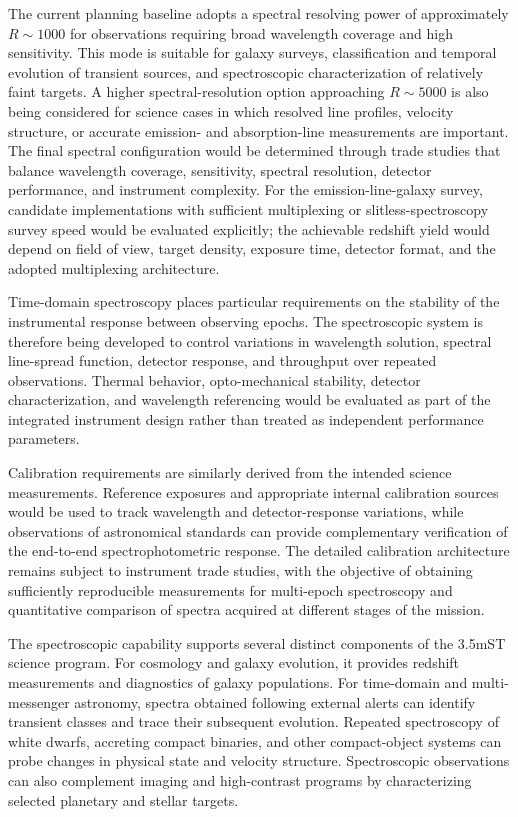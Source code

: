 The current planning baseline adopts a spectral resolving power of
approximately $R \sim 1000$ for observations requiring broad wavelength
coverage and high sensitivity. This mode is suitable for galaxy surveys,
classification and temporal evolution of transient sources, and
spectroscopic characterization of relatively faint targets. A higher
spectral-resolution option approaching $R \sim 5000$ is also being
considered for science cases in which resolved line profiles, velocity
structure, or accurate emission- and absorption-line measurements are
important. The final spectral configuration would be determined through
trade studies that balance wavelength coverage, sensitivity, spectral
resolution, detector performance, and instrument complexity. For the
emission-line-galaxy survey, candidate implementations with sufficient
multiplexing or slitless-spectroscopy survey speed would be evaluated
explicitly; the achievable redshift yield would depend on field of view,
target density, exposure time, detector format, and the adopted multiplexing
architecture.

Time-domain spectroscopy places particular requirements on the stability
of the instrumental response between observing epochs. The spectroscopic
system is therefore being developed to control variations in wavelength
solution, spectral line-spread function, detector response, and throughput
over repeated observations. Thermal behavior, opto-mechanical stability,
detector characterization, and wavelength referencing would be evaluated
as part of the integrated instrument design rather than treated as
independent performance parameters.

Calibration requirements are similarly derived from the intended science
measurements. Reference exposures and appropriate internal calibration
sources would be used to track wavelength and detector-response variations,
while observations of astronomical standards can provide complementary
verification of the end-to-end spectrophotometric response. The detailed
calibration architecture remains subject to instrument trade studies, with
the objective of obtaining sufficiently reproducible measurements for
multi-epoch spectroscopy and quantitative comparison of spectra acquired
at different stages of the mission.

The spectroscopic capability supports several distinct components of the
3.5mST science program. For cosmology and galaxy evolution, it provides
redshift measurements and diagnostics of galaxy populations. For
time-domain and multi-messenger astronomy, spectra obtained following
external alerts can identify transient classes and trace their subsequent
evolution. Repeated spectroscopy of white dwarfs, accreting compact
binaries, and other compact-object systems can probe changes in physical
state and velocity structure. Spectroscopic observations can also
complement imaging and high-contrast programs by characterizing selected
planetary and stellar targets.

